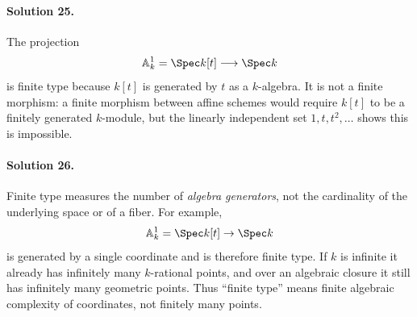 \paragraph{Solution 25.}
The projection
\[
\mathbb A^1_k=\Spec k[t]\longrightarrow\Spec k
\]
is finite type because \(k[t]\) is generated by \(t\) as a \(k\)-algebra.  It is not a finite
morphism: a finite morphism between affine schemes would require \(k[t]\) to be a finitely generated
\(k\)-module, but the linearly independent set \(1,t,t^2,\ldots\) shows this is impossible.

\paragraph{Solution 26.}
Finite type measures the number of \emph{algebra generators}, not the cardinality of the underlying
space or of a fiber.  For example,
\[
\mathbb A^1_k=\Spec k[t]\to\Spec k
\]
is generated by a single coordinate and is therefore finite type.  If \(k\) is infinite it already
has infinitely many \(k\)-rational points, and over an algebraic closure it still has infinitely many
geometric points.  Thus ``finite type'' means finite algebraic complexity of coordinates, not
finitely many points.
